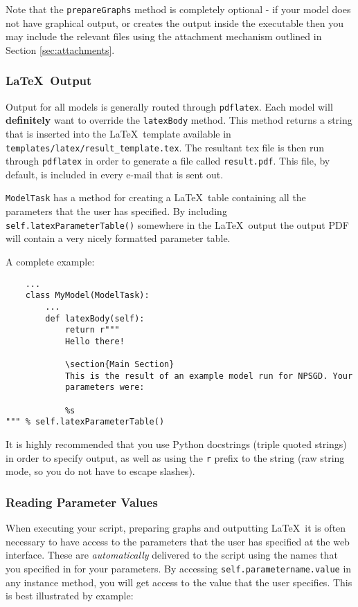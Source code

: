 \documentclass{article}
\newcommand{\mpath}[1]{\texttt{#1}}
\newcommand{\mclass}[1]{\texttt{#1}}
\begin{document}
Note that the \texttt{prepareGraphs} method is completely optional - if your
model does not have graphical output, or creates the output inside the
executable then you may include the relevant files using the attachment mechanism
outlined in Section \ref{sec:attachments}.


\subsubsection{\LaTeX\ Output}
\label{sec:LatexOutput}
Output for all models is generally routed through \texttt{pdflatex}. Each model will
\textbf{definitely} want to override the \texttt{latexBody} method. This method
returns a string that is inserted into the \LaTeX\ template available in
\mpath{templates/latex/result\_template.tex}. The resultant tex file is then run through 
\texttt{pdflatex} in order to generate a file
called \mpath{result.pdf}. This file, by default, is included in every e-mail
that is sent out.

\mclass{ModelTask} has a method for creating a \LaTeX\ table containing
all the parameters that the user has specified. By including
\texttt{self.latexParameterTable()} somewhere in the \LaTeX\ output the output
PDF will contain a very nicely formatted parameter table.

A complete example:
\begin{lstlisting}
    ...
    class MyModel(ModelTask):
        ...
        def latexBody(self):
            return r"""
            Hello there!

            \section{Main Section}
            This is the result of an example model run for NPSGD. Your
            parameters were:

            %s
""" % self.latexParameterTable()
\end{lstlisting}

It is highly recommended that you use Python docstrings (triple quoted strings)
in order to specify output, as well as using the \texttt{r} prefix to the string
(raw string mode, so you do not have to escape slashes).

\subsubsection{Reading Parameter Values}
When executing your script, preparing graphs and outputting \LaTeX\ it is often
necessary to have access to the parameters that the user has specified at the
web interface. These are \textit{automatically} delivered to the script using
the names that you specified in for your parameters. By accessing
\texttt{self.parametername.value} in any instance method, you will get access to
the value that the user specifies. This is best illustrated by example:
\end{document}
